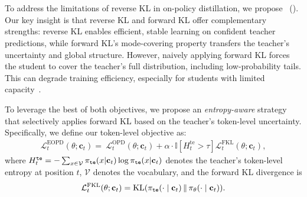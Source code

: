 \section{\methodfullname}\label{sec:main_method}


To address the limitations of reverse KL in on-policy distillation, we propose \methodfullname~(\method). 
Our key insight is that reverse KL and forward KL offer complementary strengths: reverse KL enables efficient, stable learning on confident teacher predictions, while forward KL's mode-covering property %
transfers the teacher's uncertainty and global structure. 
However, naively applying forward KL forces the student to cover the teacher's full distribution, including low-probability tails. This can degrade training efficiency, especially for students with limited capacity~\cite{gu2024minillm, cha2025knowledge}.




To leverage the best of both objectives, we propose an \emph{entropy-aware} strategy that selectively applies forward KL based on the teacher's token-level uncertainty. Specifically, we define our token-level objective as:
\begin{equation}
\label{eq:eaopd}
\begin{aligned}
\mathcal{L}_t^{\text{EOPD}}(\theta;\mathbf{c}_t)  = ~ 
\mathcal{L}_t^{\text{OPD}} (\theta;\mathbf{c}_t) + \alpha \cdot \mathbb{I}\!\left[ H_t^{\text{te}} > \tau \right] 
\mathcal{L}^{\text{FKL}}_t (\theta;\mathbf{c}_t),
\end{aligned}
\end{equation}
where $H_t^{{\tt te}} = -\sum_{x\in\mathcal{V}} \pi_{\tt te}(x|\mathbf{c}_t)\log \pi_{\tt te}(x|\mathbf{c}_t)$ denotes the teacher's token-level entropy at position $t$, $\mathcal{V}$ denotes the vocabulary, and the forward KL divergence is 
\[
\mathcal{L}_{t}^{\textrm{FKL}}(\theta;\mathbf{c}_t) = \mathrm{KL}(\pi_{\tt{te}}(\cdot\mid\mathbf{c}_t) \,\|\, \pi_{\theta}(\cdot\mid\mathbf{c}_t)).
\]

